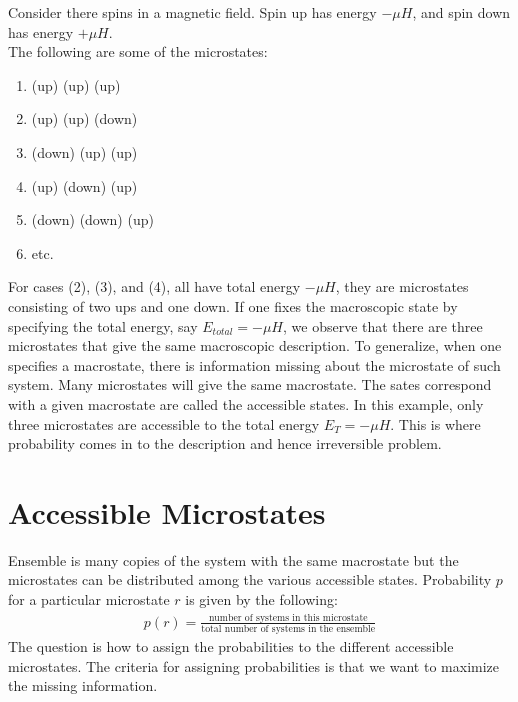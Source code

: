 \documentclass[11pt,oneside]{book}
\theoremstyle{break}
\theoremstyle{break}
\begin{document}
Consider there spins in a magnetic field. Spin up has energy $-\mu H$, and spin down has energy $+\mu H$. \\
The following are some of the microstates:
\begin{enumerate}[topsep=3pt,itemsep=-1ex,partopsep=1ex,parsep=1ex]
\item (up) (up) (up)
\item (up) (up) (down)
\item (down) (up) (up)
\item (up) (down) (up)
\item (down) (down) (up)
\item etc.
\end{enumerate}
For cases (2), (3), and (4), all have total energy $-\mu H$, they are microstates consisting of two ups and one down. If one fixes the macroscopic state by specifying the total energy, say $E_{total} = -\mu H$, we observe that there are three microstates that give the same macroscopic description. To generalize, when one specifies a macrostate, there is information missing about the microstate of such system. Many microstates will give the same macrostate. The sates correspond with a given macrostate are called the accessible states. In this example, only three microstates are accessible to the total energy $E_T = -\mu H$. This is where probability comes in to the description and hence irreversible problem. 

\newpage
\section[Accessible Microstates]{\color{red}Accessible Microstates\color{black}}
Ensemble is many copies of the system with the same macrostate but the microstates can be distributed among the various accessible states. Probability $p$ for a particular microstate $r$ is given by the following:
\begin{align*}
p(r) = \frac{\text{number of systems in this microstate}}{\text{total number of systems in the ensemble}}
\end{align*}
The question is how to assign the probabilities to the different accessible microstates. The criteria for assigning probabilities is that we want to maximize the missing information.\\
\end{document}
